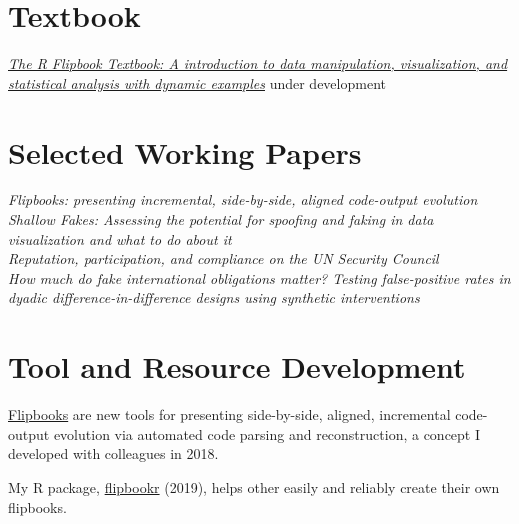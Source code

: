 \documentclass[margin, 10pt]{CVStyleTemplate}\usepackage[]{graphicx}\usepackage[dvipsnames]{xcolor}
\begin{document}
\begin{resume}
\section{Textbook}

\emph{\href{https://evamaerey.github.io/flipbooks/textbook}{The R Flipbook Textbook: A introduction to data manipulation, visualization, and statistical analysis with dynamic examples}} under development


\section{Selected Working Papers}


\emph{Flipbooks: presenting incremental, side-by-side, aligned code-output evolution}\\[6pt]
\emph{Shallow Fakes: Assessing the potential for spoofing and faking in data visualization and what to do about it}\\[6pt]
\emph{Reputation, participation, and compliance on the UN Security Council}\\[6pt]
\emph{How much do \emph{fake} international obligations matter?  Testing false-positive rates in dyadic difference-in-difference designs using synthetic interventions}\\[6pt]

\section{Tool and Resource Development}

\href{https://evamaerey.github.io/little_flipbooks_library/about/what_the_flipbook}{Flipbooks} are new tools for presenting side-by-side, aligned, incremental code-output evolution via automated code parsing and reconstruction, a concept I developed with colleagues in 2018.



My R package, \href{https://github.com/EvaMaeRey/flipbookr}{flipbookr} (2019), helps other easily and reliably create their own flipbooks.


\end{resume}
\end{document}
